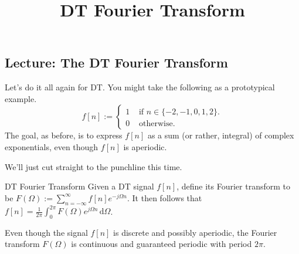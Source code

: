 \title{DT Fourier Transform}



\subsection{Lecture: The DT Fourier Transform}

Let's do it all again for DT.
You might take the following as a prototypical example.
\[ f[n] := \begin{cases}
1 & \text{ if } n \in \{-2, -1, 0, 1, 2\}. \\
0 & \text{ otherwise.}
\end{cases} \]
The goal, as before, is to express $f[n]$ as a sum (or rather, integral) of complex exponentials,
even though $f[n]$ is aperiodic.

We'll just cut straight to the punchline this time.

\begin{theorem}{DT Fourier Transform}
    Given a DT signal $f[n]$, define its Fourier transform to be
    $F(\Omega) := \sum_{n = -\infty}^{\infty} f[n] e^{-j \Omega n}$.
    It then follows that
    $f[n] = \frac{1}{2\pi} \int_{0}^{2\pi} F(\Omega) e^{j \Omega n} \, \mathrm{d}\Omega$.
\end{theorem}

\begin{remark}
    Even though the signal $f[n]$ is discrete and possibly aperiodic,
    the Fourier transform $F(\Omega)$ is continuous and guaranteed periodic
    with period $2\pi$.
\end{remark}


